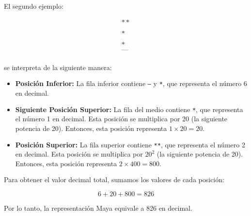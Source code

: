 \newpage
El segundo ejemplo:

\[
\begin{array}{c}
** \\
\\
*
\\
\\
* \\
\texttt{---} \\
\end{array}
\]

se interpreta de la siguiente manera:

\begin{itemize}
    \item \textbf{Posición Inferior:} La fila inferior contiene \texttt{---} y \texttt{*}, que representa el número 6 en decimal.
    \item \textbf{Siguiente Posición Superior:} La fila del medio contiene \texttt{*}, que representa el número 1 en decimal. Esta posición se multiplica por 20 (la siguiente potencia de 20). Entonces, esta posición representa $1 \times 20 = 20$.
    \item \textbf{Posición Superior:} La fila superior contiene \texttt{**}, que representa el número 2 en decimal. Esta posición se multiplica por $20^2$ (la siguiente potencia de 20). Entonces, esta posición representa 
    $2 \times 400 = 800$.
\end{itemize}

Para obtener el valor decimal total, sumamos los valores de cada posición:

\[
6 + 20 + 800 = 826
\]

Por lo tanto, la representación Maya equivale a 826 en decimal.
